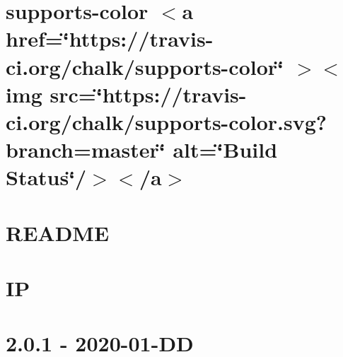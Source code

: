 \documentclass[twoside]{book}
\newcommand{\+}{\discretionary{\mbox{\scriptsize$\hookleftarrow$}}{}{}}
\begin{document}
\chapter{supports-\/color \texorpdfstring{$<$}{<}a href=\char`\"{}https\+://travis-\/ci.\+org/chalk/supports-\/color\char`\"{} \texorpdfstring{$>$}{>}\texorpdfstring{$<$}{<}img src=\char`\"{}https\+://travis-\/ci.\+org/chalk/supports-\/color.\+svg?branch=master\char`\"{} alt=\char`\"{}\+Build Status\char`\"{}/\texorpdfstring{$>$}{>}\texorpdfstring{$<$}{<}/a\texorpdfstring{$>$}{>}}
\label{md__c___users_vaishnavi_jadhav__desktop__developer_code_mean_stack_example_client_node_modules_ifc231cdab4fb1dad5bb583c93944a4a8}

\chapter{README}
\label{md__c___users_vaishnavi_jadhav__desktop__developer_code_mean_stack_example_client_node_modules_inquirer__r_e_a_d_m_e}

\chapter{IP}
\label{md__c___users_vaishnavi_jadhav__desktop__developer_code_mean_stack_example_client_node_modules_ip__r_e_a_d_m_e}

\chapter{2.0.1 -\/ 2020-\/01-\/DD}
\label{md__c___users_vaishnavi_jadhav__desktop__developer_code_mean_stack_example_client_node_modules_ipaddr_js__changes}

\end{document}
